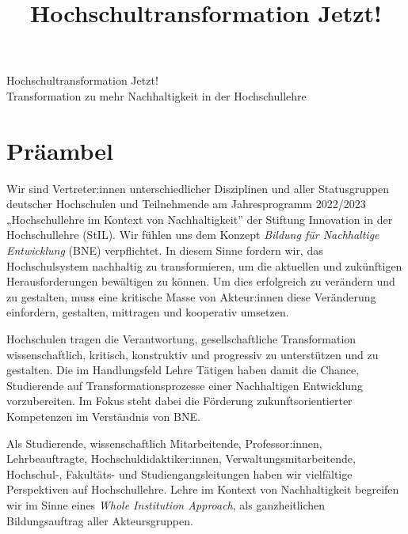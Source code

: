 \documentclass[DIV=12]{scrartcl}
\begin{document}
\newcommand*{\Autor}{}
\newcommand*{\Titel}{Hochschultransformation Jetzt!}
\newcommand*{\Untertitel}{Transformation zu mehr Nachhaltigkeit in der Hochschullehre}
\title{\Titel}

\begin{center}
	\vspace{0,1cm}
	\LARGE{\Titel}\\
	\large{\Untertitel}\\
\end{center}





\hypertarget{pruxe4ambel}{%
\section*{Präambel}\label{pruxe4ambel}}

Wir sind Vertreter:innen unterschiedlicher Disziplinen und aller
Statusgruppen deutscher Hochschulen und Teilnehmende am Jahresprogramm
2022/2023 „Hochschullehre im Kontext von Nachhaltigkeit'' der Stiftung
Innovation in der Hochschullehre (StIL). Wir fühlen uns dem Konzept
\emph{Bildung für Nachhaltige Entwicklung} (BNE) verpflichtet. In diesem
Sinne fordern wir, das Hochschulsystem nachhaltig zu transformieren, um
die aktuellen und zukünftigen Herausforderungen bewältigen zu können. Um
dies erfolgreich zu verändern und zu gestalten, muss eine kritische
Masse von Akteur:innen diese Veränderung einfordern, gestalten,
mittragen und kooperativ umsetzen.

Hochschulen tragen die Verantwortung, gesellschaftliche Transformation
wissenschaftlich, kritisch, konstruktiv und progressiv zu unterstützen
und zu gestalten. Die im Handlungsfeld Lehre Tätigen haben damit die
Chance, Studierende auf Transformationsprozesse einer Nachhaltigen
Entwicklung vorzubereiten. Im Fokus steht dabei die Förderung
zukunftsorientierter Kompetenzen im Verständnis von BNE.

Als Studierende, wissenschaftlich Mitarbeitende, Professor:innen,
Lehrbeauftragte, Hochschuldidaktiker:innen, Verwaltungsmitarbeitende,
Hochschul-, Fakultäts- und Studiengangsleitungen haben wir vielfältige
Perspektiven auf Hochschullehre. Lehre im Kontext von Nachhaltigkeit
begreifen wir im Sinne eines \emph{Whole Institution Approach}, als
ganzheitlichen Bildungsauftrag aller Akteursgruppen.
\end{document}
